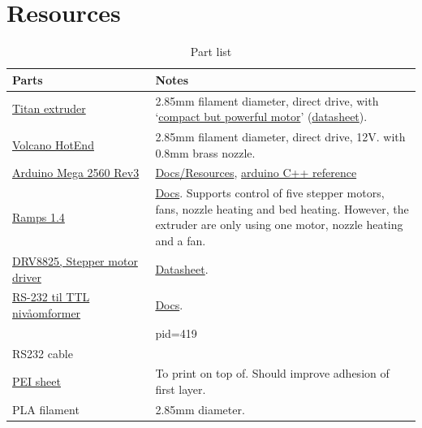 \documentclass[10pt]{article}
\begin{document}
\section{Resources}
\begin{table}[h]
	\centering
	{
	\captionsetup{width=\linewidth}
	\caption{Part list}
	\label{}
	}
	\vspace{-0.6em}
	\setlength\tabcolsep{6pt} %
	\begin{tabular}{p{0.35\linewidth}p{0.65\linewidth}}
	\toprule
	Parts & Notes \\
	\midrule
	\href{https://e3d-online.com/products/titan-extruder}{Titan extruder} & 2.85mm filament diameter, direct drive, with `\href{https://e3d-online.com/products/motors}{compact but powerful motor}' (\href{https://e3d-online.zendesk.com/hc/en-us/article_attachments/360016616377/Compact_But_Powerful_Motor.pdf}{datasheet}). \\
	\href{https://e3d-online.com/products/volcano-hotend}{Volcano HotEnd} & 2.85mm filament diameter, direct drive, 12V. with 0.8mm brass nozzle.  \\
	\href{https://store.arduino.cc/products/arduino-mega-2560-rev3}{Arduino Mega 2560 Rev3} & \href{https://docs.arduino.cc/hardware/mega-2560}{Docs/Resources}, \href{https://www.arduino.cc/reference/en/}{arduino C++ reference} \\
	\href{https://www.electrokit.com/produkt/ramps-1-4-shield}{Ramps 1.4} & \href{https://reprap.org/wiki/RAMPS_1.4}{Docs}. Supports control of five stepper motors, fans, nozzle heating and bed heating. However, the extruder are only using one motor, nozzle heating and a fan. \\
	\href{https://www.electrokit.com/produkt/stegmotordrivare-drv8825/}{DRV8825, Stepper motor driver} & \href{https://www.electrokit.com/uploads/productfile/41016/drv8825.pdf}{Datasheet}. \\
	\href{https://www.sparkfun.com/products/449}{RS-232 til TTL nivåomformer} & \href{https://github.com/sparkfun/RS232_Shifter_SMD}{Docs}. \\
	\href{http://www.sunrichtech.com.hk/ProductShow.aspx?Mid=1&pid=419}{PCIe RS232 computer card} &  \\
	RS232 cable &  \\
	\href{https://www.e3printable.no/nettbutikk-norge/83-byggeplate/345-pei-byggeplate/?variantId=215}{PEI sheet} & To print on top of. Should improve adhesion of first layer. \\
	PLA filament & 2.85mm diameter. \\
	\bottomrule
	\end{tabular}
\end{table}
\end{document}
